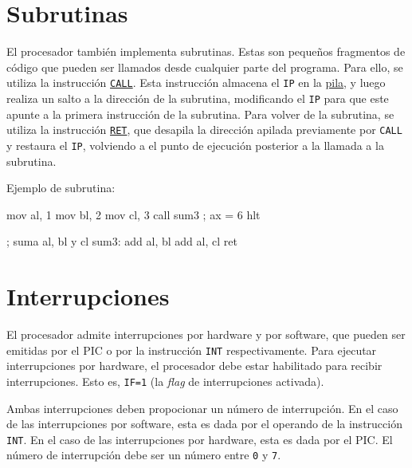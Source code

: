 \documentclass[12pt,oneside]{templates/unerthesis}
\newenvironment{Shaded}{\begin{snugshade}}{\end{snugshade}}
\newcommand{\NormalTok}[1]{#1}
\begin{document}
\hypertarget{subrutinas}{%
\section{Subrutinas}\label{subrutinas}}

El procesador también implementa subrutinas. Estas son pequeños fragmentos de código que pueden ser llamados desde cualquier parte del programa. Para ello, se utiliza la instrucción \href{./instructions/call}{\texttt{CALL}}. Esta instrucción almacena el \texttt{IP} en la \protect\hyperlink{pila}{pila}, y luego realiza un salto a la dirección de la subrutina, modificando el \texttt{IP} para que este apunte a la primera instrucción de la subrutina. Para volver de la subrutina, se utiliza la instrucción \href{./instructions/ret}{\texttt{RET}}, que desapila la dirección apilada previamente por \texttt{CALL} y restaura el \texttt{IP}, volviendo a el punto de ejecución posterior a la llamada a la subrutina.

Ejemplo de subrutina:

\begin{Shaded}
\begin{Highlighting}[]
\NormalTok{      mov al, 1}
\NormalTok{      mov bl, 2}
\NormalTok{      mov cl, 3}
\NormalTok{      call sum3}
\NormalTok{      ; ax = 6}
\NormalTok{      hlt}

\NormalTok{      ; suma al, bl y cl}
\NormalTok{      sum3: add al, bl}
\NormalTok{            add al, cl}
\NormalTok{            ret}
\end{Highlighting}
\end{Shaded}

\hypertarget{interrupciones}{%
\section{Interrupciones}\label{interrupciones}}

El procesador admite interrupciones por hardware y por software, que pueden ser emitidas por el PIC o por la instrucción \texttt{INT} respectivamente. Para ejecutar interrupciones por hardware, el procesador debe estar habilitado para recibir interrupciones. Esto es, \texttt{IF=1} (la \emph{flag} de interrupciones activada).

Ambas interrupciones deben propocionar un número de interrupción. En el caso de las interrupciones por software, esta es dada por el operando de la instrucción \texttt{INT}. En el caso de las interrupciones por hardware, esta es dada por el PIC. El número de interrupción debe ser un número entre \texttt{0} y \texttt{7}.
\end{document}
